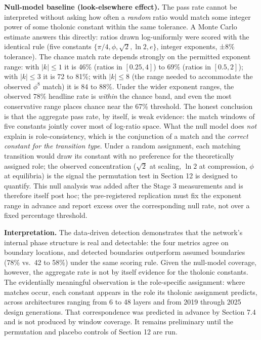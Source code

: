 \documentclass[12pt]{article}
\begin{document}
\textbf{Null-model baseline (look-elsewhere effect).} The pass rate
cannot be interpreted without asking how often a \emph{random} ratio
would match some integer power of some tholonic constant within the same
tolerance. A Monte Carlo estimate answers this directly: ratios drawn
log-uniformly were scored with the identical rule (five constants
\(\{\pi/4, \phi, \sqrt{2}, \ln 2, e\}\), integer exponents, ±8\%
tolerance). The chance match rate depends strongly on the permitted
exponent range: with \(|k| \le 1\) it is 46\% (ratios in \([0.25, 4]\))
to 69\% (ratios in \([0.5, 2]\)); with \(|k| \le 3\) it is 72 to 81\%;
with \(|k| \le 8\) (the range needed to accommodate the observed
\(\phi^8\) match) it is 84 to 88\%. Under the wider exponent ranges, the
observed 78\% headline rate is \emph{within} the chance band, and even
the most conservative range places chance near the 67\% threshold. The
honest conclusion is that the aggregate pass rate, by itself, is weak
evidence: the match windows of five constants jointly cover most of
log-ratio space. What the null model does \emph{not} explain is
role-consistency, which is the conjunction of a match and the
\emph{correct constant for the transition type}. Under a random
assignment, each matching transition would draw its constant with no
preference for the theoretically assigned role; the observed
concentration (\(\sqrt{2}\) at scaling, \(\ln 2\) at compression,
\(\phi\) at equilibria) is the signal the permutation test in Section 12
is designed to quantify. This null analysis was added after the Stage 3
measurements and is therefore itself post hoc; the pre-registered
replication must fix the exponent range in advance and report excess
over the corresponding null rate, not over a fixed percentage threshold.

\textbf{Interpretation.} The data-driven detection demonstrates that the
network's internal phase structure is real and detectable: the four
metrics agree on boundary locations, and detected boundaries outperform
assumed boundaries (78\% vs.~42 to 58\%) under the same scoring rule.
Given the null-model coverage, however, the aggregate rate is not by
itself evidence for the tholonic constants. The evidentially meaningful
observation is the role-specific assignment: where matches occur, each
constant appears in the role its tholonic assignment predicts, across
architectures ranging from 6 to 48 layers and from 2019 through 2025
design generations. That correspondence was predicted in advance by
Section 7.4 and is not produced by window coverage. It remains
preliminary until the permutation and placebo controls of Section 12 are
run.
\end{document}
